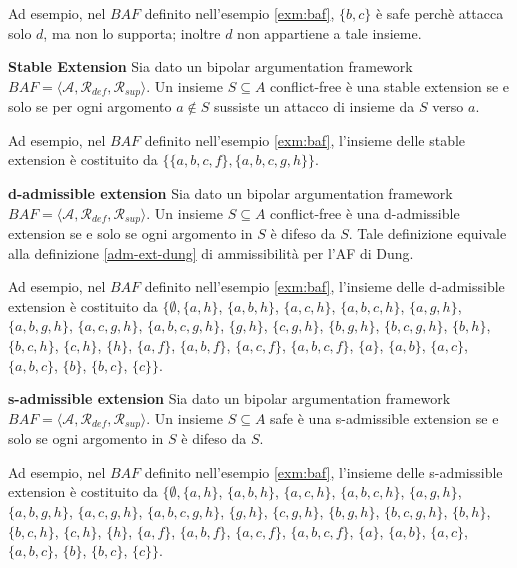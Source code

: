 Ad esempio, nel $BAF$ definito nell'esempio \ref{exm:baf}, $\{b, c\}$ è safe perchè attacca solo $d$, ma non lo supporta; inoltre $d$ non appartiene a tale insieme.


\bigskip
\begin{defn} \textbf{Stable Extension} 
Sia dato un bipolar argumentation framework $BAF = ⟨\mathcal{A}, \mathcal{R}_{def}, \mathcal{R}_{sup}⟩$. Un insieme $S \subseteq A$ conflict-free è una stable extension se e solo se per ogni argomento $a \notin S$ sussiste un attacco di insieme da $S$ verso $a$.
\end{defn}

Ad esempio, nel $BAF$ definito nell'esempio \ref{exm:baf}, l'insieme delle stable extension è costituito da $\{\{a, b, c, f\}, \{a, b, c, g, h\}\}$.


\bigskip
\begin{defn} \textbf{d-admissible extension} 
Sia dato un bipolar argumentation framework $BAF = ⟨\mathcal{A}, \mathcal{R}_{def}, \mathcal{R}_{sup}⟩$. Un insieme $S \subseteq A$ conflict-free è una d-admissible extension se e solo se ogni argomento in $S$ è difeso da $S$. Tale definizione equivale alla definizione \ref{adm-ext-dung} di ammissibilità per l'AF di Dung.
\end{defn}

Ad esempio, nel $BAF$ definito nell'esempio \ref{exm:baf}, l'insieme delle d-admissible extension è costituito da $\{∅, \{a, h\}$, $\{a, b, h\}$, $\{a, c, h\}$, $\{a, b, c, h\}$, $\{a, g, h\}$, $\{a, b, g, h\}$, $\{a, c, g, h\}$, $\{a, b, c, g, h\}$, $\{g, h\}$, $\{c, g, h\}$, $\{b, g, h\}$, $\{b, c, g, h\}$, $\{b, h\}$, $\{b, c, h\}$, $\{c, h\}$, $\{h\}$, $\{a, f\}$, $\{a, b, f \}$, $\{a, c, f \}$, $\{a, b, c, f \}$, $\{a\}$, $\{a, b\}$, $\{a, c\}$, $\{a, b, c\}$, $\{b\}$, $\{b, c\}$, $\{c\}\}$.


\bigskip
\begin{defn} \textbf{s-admissible extension} 
Sia dato un bipolar argumentation framework $BAF = ⟨\mathcal{A}, \mathcal{R}_{def}, \mathcal{R}_{sup}⟩$. Un insieme $S \subseteq A$ safe è una s-admissible extension se e solo se ogni argomento in $S$ è difeso da $S$.
\end{defn}

Ad esempio, nel $BAF$ definito nell'esempio \ref{exm:baf}, l'insieme delle s-admissible extension è costituito da $\{∅, \{a, h\}$, $\{a, b, h\}$, $\{a, c, h\}$, $\{a, b, c, h\}$, $\{a, g, h\}$, $\{a, b, g, h\}$, $\{a, c, g, h\}$, $\{a, b, c, g, h\}$, $\{g, h\}$, $\{c, g, h\}$, $\{b, g, h\}$, $\{b, c, g, h\}$, $\{b, h\}$, $\{b, c, h\}$, $\{c, h\}$, $\{h\}$, $\{a, f \}$, $\{a, b, f \}$, $\{a, c, f \}$, $\{a, b, c, f \}$, $\{a\}$, $\{a, b\}$, $\{a, c\}$, $\{a, b, c\}$, $\{b\}$, $\{b, c\}$, $\{c\}\}$.


